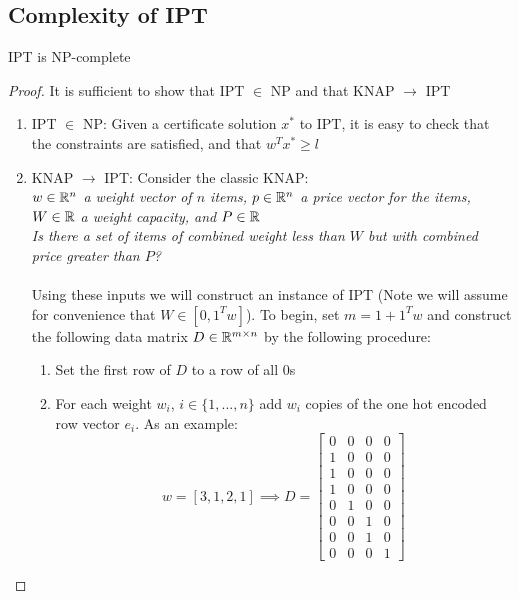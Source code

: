 \documentclass[12pt]{article}
\newcommand{\priv}{\text{IPT}}
\begin{document}
\subsection{Complexity of \gls{IPT}}
\begin{theorem}
    \gls{IPT} is NP-complete
\end{theorem}
\begin{proof}
    It is sufficient to show that \gls{IPT} $\in $ NP and that \gls{KNAP} $ \longrightarrow$  \gls{IPT}
    \begin{enumerate}
        \item \gls{IPT} $\in $ NP: Given a certificate solution $x^*$ to $\priv$, it is easy to check that the constraints are satisfied, and that $w^T x^* \geq l$
        \item \gls{KNAP} $ \longrightarrow$  \gls{IPT}: Consider the classic \gls{KNAP}:
        \\ 
        \textit{$w \in \mathbb{R}^n$ a weight vector of $n$ items, $p \in \mathbb{R}^n$ a price vector for the items, $W\in \mathbb{R}$ a weight capacity, and $P \in \mathbb{R}$}
        \\ 
        \textit{Is there a set of items of combined weight less than $W$ but with combined price greater than $P$?}
        \\~\\ 
        Using these inputs we will construct an instance of \gls{IPT} (Note we will assume for convenience that $W \in [0,1^Tw]$). To begin, set $m = 1+ 1^Tw$ and construct the following data matrix $D \in \mathbb{R}^{m\times n}$ by the following procedure:
        \begin{enumerate}
            \item Set the first row of $D$ to a row of all $0$s
            \item For each weight $w_i$, $i\in\{1,...,n\}$ add $w_i$ copies of the one hot encoded row vector $e_i$. As an example:
            \[w = [3,1,2,1] \implies D = \begin{bmatrix}
                0&0&0&0 \\
                1&0&0&0 \\
                1&0&0&0 \\
                1&0&0&0 \\
                0&1&0&0 \\
                0&0&1&0 \\
                0&0&1&0 \\
                0&0&0&1 
            \end{bmatrix}\]

\end{enumerate}
\end{enumerate}
\end{proof}
\end{document}
